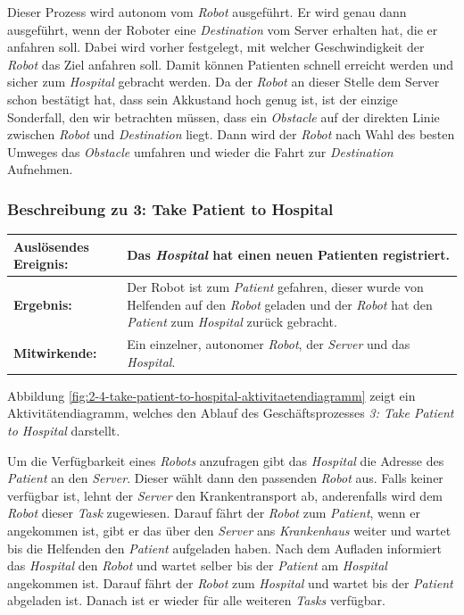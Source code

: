 			Dieser Prozess wird autonom vom \emph{Robot} ausgeführt. Er wird genau
			dann ausgeführt, wenn der Roboter eine \emph{Destination} vom Server
			erhalten hat, die er anfahren soll. Dabei wird vorher festgelegt, mit welcher Geschwindigkeit der \emph{Robot} das Ziel anfahren soll. Damit können Patienten schnell erreicht werden und sicher zum \emph{Hospital} gebracht werden. Da der \emph{Robot} an dieser Stelle
			dem Server schon bestätigt hat, dass sein Akkustand hoch genug ist, ist
			der einzige Sonderfall, den wir betrachten müssen, dass ein
			\emph{Obstacle} auf der direkten Linie zwischen \emph{Robot} und
			\emph{Destination} liegt. Dann wird der \emph{Robot} nach Wahl des
			besten Umweges das \emph{Obstacle} umfahren und wieder die Fahrt zur
			\emph{Destination} Aufnehmen.



			\subsubsection*{Beschreibung zu 3: Take Patient to Hospital}

			\begin{table}[H]
				\centering
				\begin{tabularx}{\textwidth}{|p{3cm}|X|}
				\hline
				\textbf{Auslösendes Ereignis:} & Das \emph{Hospital} hat einen neuen Patienten registriert.\\ \hline
				\textbf{Ergebnis:} & Der Robot ist zum \emph{Patient} gefahren, dieser wurde von Helfenden auf den \emph{Robot} geladen 
				und der \emph{Robot} hat den \emph{Patient} zum \emph{Hospital} zurück gebracht.\\ \hline
				\textbf{Mitwirkende:} &	Ein einzelner, autonomer \emph{Robot}, der \emph{Server} und das \emph{Hospital}. \\
				\hline
				\end{tabularx}
				\label{tab:2-4-take-patient-to-hospital}
			\end{table}

			Abbildung \ref{fig:2-4-take-patient-to-hospital-aktivitaetendiagramm} zeigt ein Aktivitätendiagramm, welches den Ablauf des Geschäftsprozesses \emph{3: Take Patient to Hospital} darstellt.

			Um die Verfügbarkeit eines \emph{Robots} anzufragen gibt das \emph{Hospital} die Adresse des \emph{Patient} an den \emph{Server}. Dieser wählt dann den passenden \emph{Robot} aus. Falls keiner verfügbar ist, lehnt der \emph{Server} den Krankentransport ab, anderenfalls wird dem \emph{Robot} dieser \emph{Task} zugewiesen. Darauf fährt der \emph{Robot} zum \emph{Patient}, wenn er angekommen ist, gibt er das über den \emph{Server} ans \emph{Krankenhaus} weiter und wartet bis die Helfenden den \emph{Patient} aufgeladen haben. Nach dem Aufladen informiert das \emph{Hospital} den \emph{Robot} und wartet selber bis der \emph{Patient} am \emph{Hospital} angekommen ist. Darauf fährt der \emph{Robot} zum \emph{Hospital} und wartet bis der \emph{Patient} abgeladen ist. Danach ist er wieder für alle weiteren \emph{Tasks} verfügbar.
			
